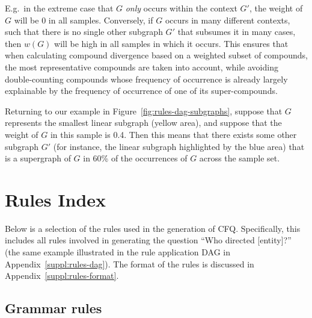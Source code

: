 \documentclass[letterpaper]{article}
\begin{document}
E.g.\ in the extreme case that $G$ \textit{only} occurs within the context $G'$, the weight of $G$ will be 0 in all samples. Conversely, if $G$ occurs in many different contexts, such that there is no single other subgraph $G'$ that subsumes it in many cases, then $w(G)$ will be high in all samples in which it occurs. This ensures that when calculating compound divergence based on a weighted subset of compounds, the most representative compounds are taken into account, while avoiding double-counting compounds whose frequency of occurrence is already largely explainable by the frequency of occurrence of one of its super-compounds. 

Returning to our example in Figure~\ref{fig:rules-dag-subgraphs}, suppose that $G$ represents the smallest linear subgraph (yellow area), and suppose that the weight of $G$ in this sample is 0.4. Then this means that there exists some other subgraph $G'$ (for instance, the linear subgraph highlighted by the blue area) that is a supergraph of $G$ in 60\% of the occurrences of $G$ across the sample set.


\section{Rules Index}
\label{suppl:rules-index}

Below is a selection of the rules used in the generation of CFQ. Specifically, this includes all rules involved in generating the question ``Who directed [entity]?'' (the same example illustrated in the rule application DAG in Appendix~\ref{suppl:rules-dag}). The format of the rules is discussed in Appendix~\ref{suppl:rules-format}.


\subsection{Grammar rules}
\end{document}
